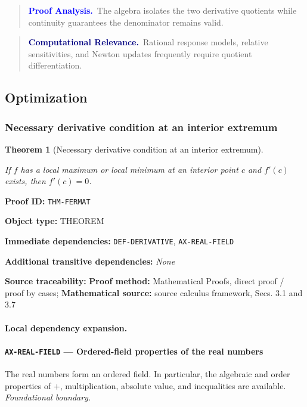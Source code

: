 \documentclass[10pt]{article}
\newcommand{\pidraw}[1]{\begingroup\urlstyle{tt}\nolinkurl{#1}\endgroup}
\newtheorem{theorem}{Theorem}[section]
\theoremstyle{definition}
\theoremstyle{remark}
\newenvironment{proofanalysis}
{\begin{quote}\small\noindent\textbf{\textcolor{blue}{Proof Analysis.}}\ }
{\end{quote}}
\newenvironment{computationalrelevance}
{\begin{quote}\small\noindent\textbf{\textcolor{navy}{Computational Relevance.}}\ }
{\end{quote}}
\newcommand{\meta}[2]{\noindent\textbf{#1:} #2\par}
\begin{document}
\begin{proofanalysis}The algebra isolates the two derivative quotients while continuity guarantees the denominator remains valid.\end{proofanalysis}

\begin{computationalrelevance}Rational response models, relative sensitivities, and Newton updates frequently require quotient differentiation.\end{computationalrelevance}

\subsection{Optimization}

\subsubsection{Necessary derivative condition at an interior extremum}

\begin{theorem}[Necessary derivative condition at an interior extremum]\label{prf:THM-FERMAT}

If $f$ has a local maximum or local minimum at an interior point $c$ and $f'(c)$ exists, then $f'(c)=0$.

\end{theorem}

\meta{Proof ID}{\pidraw{THM-FERMAT}}
\meta{Object type}{THEOREM}
\meta{Immediate dependencies}{\pidraw{DEF-DERIVATIVE}, \pidraw{AX-REAL-FIELD}}
\meta{Additional transitive dependencies}{\emph{None}}
\meta{Source traceability}{\textbf{Proof method:} Mathematical Proofs, direct proof / proof by cases; \textbf{Mathematical source:} source calculus framework, Secs. 3.1 and 3.7}

\paragraph{Local dependency expansion.}

\paragraph{\pidraw{AX-REAL-FIELD} --- Ordered-field properties of the real numbers}
The real numbers form an ordered field. In particular, the algebraic and order properties of $+$, multiplication, absolute value, and inequalities are available.
\textit{Foundational boundary.}
\end{document}
